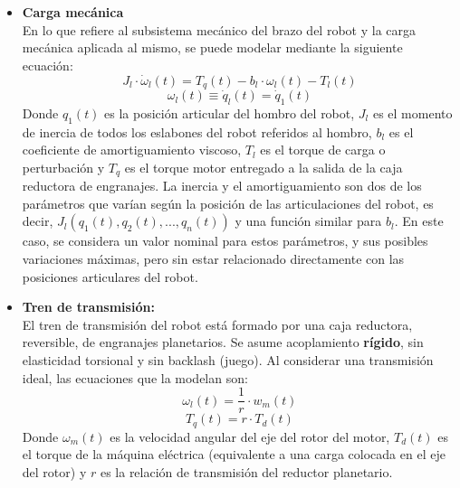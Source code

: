 \documentclass[10pt]{article}
\begin{document}
\begin{itemize}
	\item \textbf{Carga mecánica}\vspace{0.3cm}\\
	En lo que refiere al subsistema mecánico del brazo del robot y la carga mecánica aplicada al mismo, se puede modelar mediante la siguiente ecuación:
	\begin{equation}
		\label{eqn:cargaMecanica}
		J_{l}\cdot \dot{\omega }_{l}\left ( t \right )=T_{q}\left ( t \right )-b_{l}\cdot \omega_{l}\left ( t \right )-T_{l}\left ( t \right )
	\end{equation}
	\begin{equation}
		\omega_{l}\left ( t \right )\equiv \dot{q}_{l}\left ( t \right )= \dot{q}_1\left ( t \right )
	\end{equation}
	Donde $q_{1}(t)$ es la posición articular del hombro del robot, $J_{l}$ es el momento de inercia de todos los eslabones del robot referidos al hombro, $b_{l}$ es el coeficiente de amortiguamiento viscoso, $T_{l}$ es el torque de carga o perturbación y $T_{q}$ es el torque motor entregado a la salida de la caja reductora de engranajes.
	La inercia y el amortiguamiento son dos de los parámetros que varían según la posición de las articulaciones del robot, es decir, $J_{l}(q_{1}(t),q_{2}(t),...,q_{n}(t))$ y una función similar para $b_{l}$.
	En este caso, se considera un valor nominal para estos parámetros, y sus posibles variaciones máximas, pero sin estar relacionado directamente con las posiciones articulares del robot.
	
	\item \textbf{Tren de transmisión:}\vspace{0.3cm}\\
	El tren de transmisión del robot está formado por una caja reductora, reversible, de engranajes planetarios. Se asume acoplamiento \textbf{rígido}, sin elasticidad torsional y sin backlash (juego). Al considerar una transmisión ideal, las ecuaciones que la modelan son:
	\begin{equation}
		\label{eqn:relacionTransmision}
		\omega_{l}\left ( t \right )=\frac{1}{r}\cdot w_{m}\left ( t \right )
	\end{equation}
	\begin{equation}
		\label{eqn:torqueTransmision}
		T_{q}\left ( t \right )=r\cdot T_{d}\left ( t \right )
	\end{equation}
	Donde $\omega_{m}(t)$ es la velocidad angular del eje del rotor del motor, $T_{d}(t)$ es el torque de la máquina eléctrica (equivalente a una carga colocada en el eje del rotor) y $r$ es la relación de transmisión del reductor planetario.
	

\end{itemize}
\end{document}
